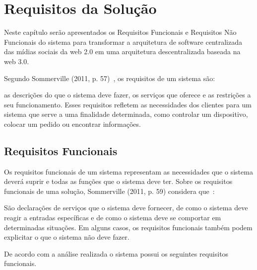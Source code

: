 \section{Requisitos da Solução}

Neste capítulo serão apresentados os Requisitos Funcionais e Requisitos Não Funcionais do sistema para transformar a arquitetura de software centralizada das mídias sociais da web 2.0 em uma arquitetura descentralizada baseada na web 3.0.

Segundo Sommerville (2011, p. 57)~\cite{SOMMERVILLE1}, os requisitos de um sistema são:

\begin{directcite}
as descrições do que o sistema deve fazer, os serviços que oferece e as restrições a seu funcionamento.
Esses requisitos refletem as necessidades dos clientes para um sistema que serve a uma finalidade determinada, como controlar um dispositivo, colocar um pedido ou encontrar informações.
\end{directcite}

\subsection{Requisitos Funcionais}

Os requisitos funcionais de um sistema representam as necessidades que o sistema deverá suprir e todas as funções que o sistema deve ter.
Sobre os requisitos funcionais de uma solução, Sommerville (2011, p. 59) considera que~\cite{SOMMERVILLE1}:

\begin{directcite}
São declarações de serviços que o sistema deve fornecer, de como
o sistema deve reagir a entradas específicas e de como o sistema
deve se comportar em determinadas situações. Em alguns casos, os
requisitos funcionais também podem explicitar o que o sistema não
deve fazer.
\end{directcite}

De acordo com a análise realizada o sistema possui os seguintes requisitos funcionais.

